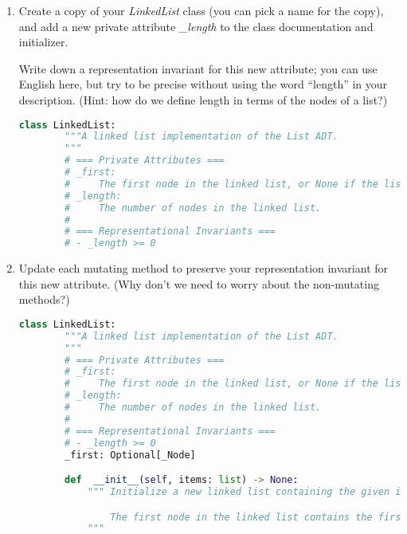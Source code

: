 \documentclass[12pt]{article}
\begin{document}
\begin{enumerate}[1.]
    \item Create a copy of your \textit{LinkedList} class (you can pick a name for the copy),
    and add a new private attribute \textit{\_length} to the class documentation and initializer.

    \bigskip

    Write down a representation invariant for this new attribute; you can use
    English here, but try to be precise without using the word “length” in your
    description. (Hint: how do we define length in terms of the nodes of a list?)

    \bigskip

    \begin{mdframed}
    \begin{lstlisting}[language=python,caption={task\_3\_step\_1\_solution.py}]
    class LinkedList:
        """A linked list implementation of the List ADT.
        """
        # === Private Attributes ===
        # _first:
        #     The first node in the linked list, or None if the list is empty.
        # _length:
        #     The number of nodes in the linked list.
        #
        # === Representational Invariants ===
        # - _length >= 0
    \end{lstlisting}
    \end{mdframed}

    \item Update each mutating method to preserve your representation invariant for this new attribute.
    (Why don’t we need to worry about the non-mutating methods?)

    \begin{mdframed}
    \begin{lstlisting}[language=python,caption={task\_3\_step\_2\_solution.py}]
    class LinkedList:
        """A linked list implementation of the List ADT.
        """
        # === Private Attributes ===
        # _first:
        #     The first node in the linked list, or None if the list is empty.
        # _length:
        #     The number of nodes in the linked list.
        #
        # === Representational Invariants ===
        # - _length >= 0
        _first: Optional[_Node]

        def  __init__(self, items: list) -> None:
            """ Initialize a new linked list containing the given items.

                The first node in the linked list contains the first item in <items>
            """


\end{lstlisting}
\end{mdframed}
\end{enumerate}
\end{document}
